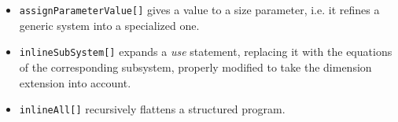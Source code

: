 \begin{itemize}

\item \texttt{assignParameterValue[]} 
gives a value to a size parameter, i.e. it refines a generic system
into a specialized one.

\item \texttt{inlineSubSystem[]}  expands a
\emph{use} statement, replacing it with the equations of the
corresponding subsystem, properly modified to take the dimension
extension into account.

\item \texttt{inlineAll[]}  recursively flattens a
structured {\alfa} program.

\end{itemize}











